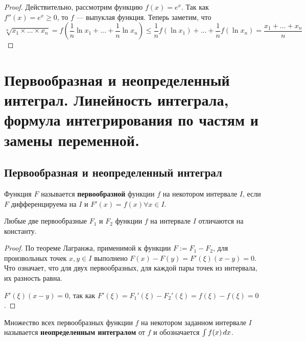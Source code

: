 \documentclass[a4paper]{article}
\theoremstyle{named}
\renewcommand{\int}{\intop}
\begin{document}
        \begin{proof}
            Действительно, рассмотрим функцию $f(x) = e^x$. Так как $f''(x) = e^x \geq 0$, то $f$ --- выпуклая функция. Теперь заметим, что
            \begin{equation*}
                \sqrt[n]{x_1 \times \dots \times x_n} = f \left(\dfrac{1}{n} \ln x_1 + \dots + \dfrac{1}{n} \ln x_n \right) \leq \dfrac{1}{n} f(\ln x_1) + \dots + \dfrac{1}{n}f(\ln x_n) = \dfrac{x_1 + \dots + x_n}{n}
            \end{equation*}
        \end{proof}


    \section{Первообразная и неопределенный интеграл. Линейность интеграла, формула интегрирования по частям и замены переменной.}

        \subsection{Первообразная и неопределенный интеграл}

        \begin{definition*}
            Функция $F$ называется \textbf{первообразной} функции $f$ на некотором интервале $I$, если $F$ дифференцируема на $I$ и $F'(x) = f(x) \forall x \in I$.
        \end{definition*}

        \begin{lemma*}
            Любые две первообразные $F_1$ и $F_2$ функции $f$ на интервале $I$ отличаются на константу.
        \end{lemma*}

        \begin{proof}
            По теореме Лагранжа, применимой к функции $F := F_1 - F_2$, для произвольных точек $x, y \in I$ выполнено $F(x) - F(y) = F'(\xi)(x - y) = 0$. Что означает, что для двух первообразных, для каждой пары точек из интервала, их разность равна. 

            $F'(\xi)(x - y) = 0$, так как $F'(\xi) = F_1'(\xi) - F_2'(\xi) = f(\xi) - f(\xi) = 0$.
        \end{proof}

        \begin{definition*}
            Множество всех первообразных функции $f$ на некотором заданном интервале $I$ называется \textbf{неопределенным интегралом} от $f$ и обозначается $\int f(x) \dd x$.
        \end{definition*}
\end{document}
